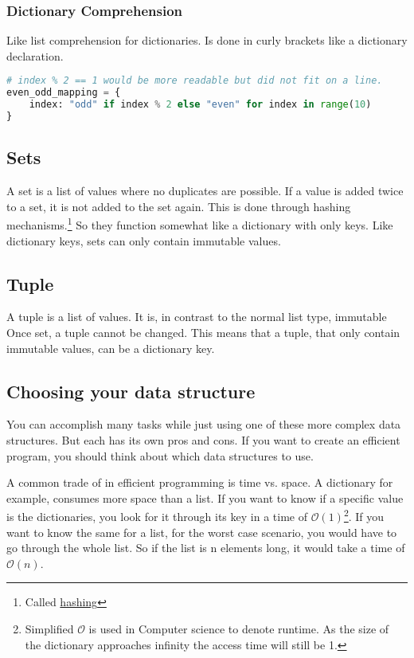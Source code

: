 \documentclass{article}
\begin{document}
\subsubsection{Dictionary Comprehension}

Like list comprehension for dictionaries.
Is done in curly brackets like a dictionary declaration.

\begin{lstlisting}[language=Python]
# index % 2 == 1 would be more readable but did not fit on a line.
even_odd_mapping = {
    index: "odd" if index % 2 else "even" for index in range(10)
}
\end{lstlisting}

\subsection{Sets}

A set is a list of values where no duplicates are possible.
If a value is added twice to a set, it is not added to the set again.
This is done through hashing mechanisms.\footnote{
    Called \href{https://en.wikipedia.org/wiki/Hash_function}{hashing}
}
So they function somewhat like a dictionary with only keys.
Like dictionary keys, sets can only contain immutable values.

\subsection{Tuple}

A tuple is a list of values.
It is, in contrast to the normal list type, immutable
Once set, a tuple cannot be changed.
This means that a tuple, that only contain immutable values, can be a dictionary key.

\subsection{Choosing your data structure}

You can accomplish many tasks while just using one of these more complex data structures.
But each has its own pros and cons.
If you want to create an efficient program, you should think about which data structures
to use.

A common trade of in efficient programming is time vs. space.
A dictionary for example, consumes more space than a list.
If you want to know if a specific value is the dictionaries, you look for
it through its key in a time of $\mathcal{O}(1)$\footnote{Simplified
    $\mathcal{O}$ is used in Computer science to denote runtime.
    As the size of the dictionary approaches infinity the access time will still be 1.
}.
If you want to know the same for a list, for the worst case scenario, you would
have to go through the whole list.
So if the list is n elements long, it would take a time of $\mathcal{O}(n)$.
\end{document}
